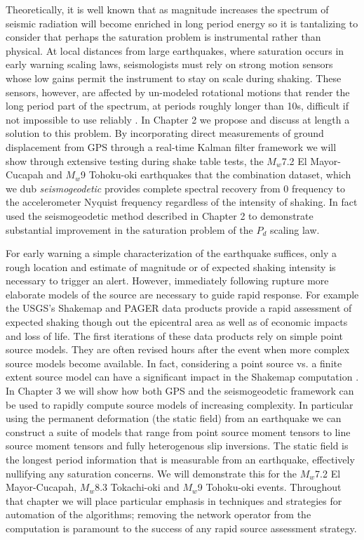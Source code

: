 Theoretically, it is well known that as magnitude increases the spectrum of seismic radiation will become enriched in long period energy \citep{haskell1964,brune1970} so it is tantalizing to consider that perhaps the saturation problem is instrumental rather than physical. At local distances from large earthquakes, where saturation occurs in early warning scaling laws, seismologists must rely on strong motion sensors whose low gains permit the instrument to stay on scale during shaking. These sensors, however, are affected by un-modeled rotational motions \citep{Trifunac2001} that render the long period part of the spectrum, at periods roughly longer than 10s, difficult if not impossible to use reliably \citep{Boore2005}. In Chapter 2 we propose and discuss at length a solution to this problem. By incorporating direct measurements of ground displacement from GPS through a real-time Kalman filter framework we will show through extensive testing during shake table tests, the $M_w$7.2 El Mayor-Cucapah and $M_w$9 Tohoku-oki earthquakes that the combination dataset, which we dub \textit{seismogeodetic} provides complete spectral recovery from 0 frequency to the accelerometer Nyquist frequency regardless of the intensity of shaking. In fact \citep{Crowell2013} used the seismogeodetic method described in Chapter 2 to demonstrate substantial improvement in the saturation problem of the $P_d$ scaling law.

For early warning a simple characterization of the earthquake suffices, only a rough location and estimate of magnitude or of expected shaking intensity is necessary to trigger an alert. However, immediately following rupture more elaborate models of the source are necessary to guide rapid response. For example the USGS's Shakemap \citep{allen2009shake} and PAGER \citep{jaiswal2010} data products provide a rapid assessment of expected shaking though out the epicentral area as well as of economic impacts and loss of life. The first iterations of these data products rely on simple point source models. They are often revised hours after the event when more complex source models become available. In fact, considering a point source vs. a finite extent source model can have a significant impact in the Shakemap computation \citep{colombelli2013}. In Chapter 3 we will show how both GPS and the seismogeodetic framework can be used to rapidly compute source models of increasing complexity. In particular using the permanent deformation (the static field) from an earthquake we can construct a suite of models that range from point source moment tensors to line source moment tensors and fully heterogenous slip inversions. The static field is the longest period information that is measurable from an earthquake, effectively nullifying any saturation concerns.  We will demonstrate this for the $M_w$7.2 El Mayor-Cucapah, $M_w$8.3 Tokachi-oki and $M_w$9 Tohoku-oki events. Throughout that chapter we will place particular emphasis in techniques and strategies for automation of the algorithms; removing the network operator from the computation is paramount to the success of any rapid source assessment strategy.

